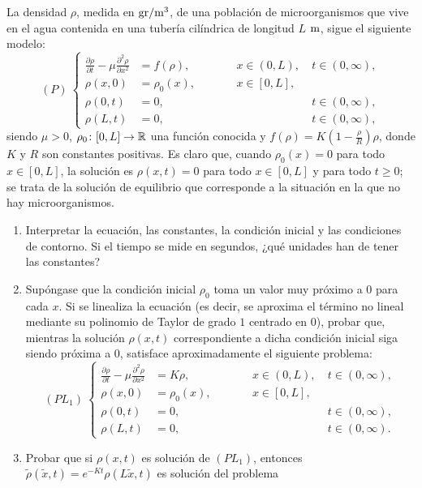 \documentclass[11pt]{report}
\begin{document}
\begin{exercise}[Junio de 2021]
    La densidad $\rho$, medida en $\textup{gr}/\textup{m}^3$, de una población de microorganismos que vive en el agua contenida en una tubería cilíndrica de longitud $L$ $\textup{m}$, sigue el siguiente modelo:
    \[(P) \ \left\{\begin{alignedat}{4}
        \frac{\partial \rho}{\partial t}-\mu\frac{\partial^2\rho}{\partial x^2} &= f(\rho), & \qquad & x \in (0,L), \ & t \in (0,\infty), \\
        \rho(x,0) &= \rho_0(x), & \qquad & x \in [0,L], & \\
        \rho(0,t) &= 0, & \qquad & \ & t \in (0,\infty), \\
        \rho(L,t) &= 0, & \qquad & \ & t \in (0,\infty),
    \end{alignedat}\right.\]
    siendo $\mu>0$, $\rho_0\colon [0,L]\to\mathbb R$ una función conocida y $f(\rho) = K(1-\frac{\rho}{R})\rho$, donde $K$ y $R$ son constantes positivas. Es claro que, cuando $\rho_0(x) = 0$ para todo $x \in [0,L]$, la solución es $\rho(x,t) = 0$ para todo $x \in [0,L]$ y para todo $t \geq 0$; se trata de la solución de equilibrio que corresponde a la situación en la que no hay microorganismos.
    \begin{enumerate}
        \item Interpretar la ecuación, las constantes, la condición inicial y las condiciones de contorno. Si el tiempo se mide en segundos, ¿qué unidades han de tener las constantes?
        \item Supóngase que la condición inicial $\rho_0$ toma un valor muy próximo a $0$ para cada $x$. Si se linealiza la ecuación (es decir, se aproxima el término no lineal mediante su polinomio de Taylor de grado $1$ centrado en $0$), probar que, mientras la solución $\rho(x,t)$ correspondiente a dicha condición inicial siga siendo próxima a $0$, satisface aproximadamente el siguiente problema:
        \[(PL_1) \ \left\{\begin{alignedat}{4}
        \frac{\partial \rho}{\partial t}-\mu\frac{\partial^2\rho}{\partial x^2} &= K\rho, & \qquad & x \in (0,L), \ & t \in (0,\infty), \\
        \rho(x,0) &= \rho_0(x), & \qquad & x \in [0,L], & \\
        \rho(0,t) &= 0, & \qquad & \ & t \in (0,\infty), \\
        \rho(L,t) &= 0, & \qquad & \ & t \in (0,\infty).
        \end{alignedat}\right.\]
        \item Probar que si $\rho(x,t)$ es solución de $(PL_1)$, entonces $\widetilde{\rho}(\widetilde{x},t) = e^{-Kt}\rho(L\widetilde{x},t)$ es solución del problema

\end{enumerate}
\end{exercise}
\end{document}
